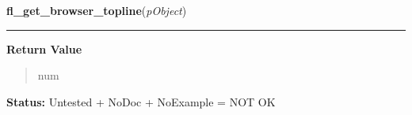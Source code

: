     \label{xformslib:library:fl_get_browser_topline}

    \vspace{0.5ex}

\hspace{.8\funcindent}\begin{boxedminipage}{\funcwidth}

    \raggedright \textbf{fl\_get\_browser\_topline}(\textit{pObject})

    \vspace{-1.5ex}

    \rule{\textwidth}{0.5\fboxrule}
\setlength{\parskip}{2ex}
\setlength{\parskip}{1ex}
      \textbf{Return Value}
    \vspace{-1ex}

      \begin{quote}
      num

      \end{quote}

\textbf{Status:} Untested + NoDoc + NoExample = NOT OK



    \end{boxedminipage}

    \label{xformslib:library:fl_get_browser}

    \vspace{0.5ex}

